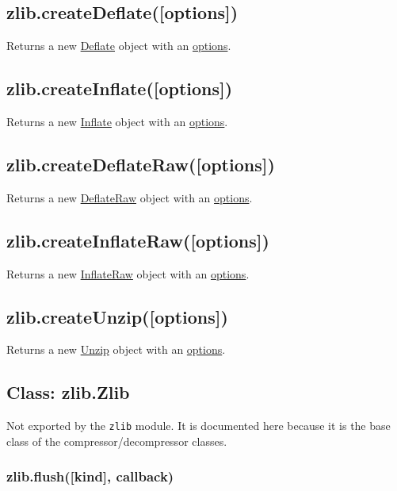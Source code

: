 \subsection{zlib.createDeflate({[}options{]})}

Returns a new \hyperref[zlib\_class\_zlib\_deflate]{Deflate} object with
an \hyperref[zlib\_options]{options}.

\subsection{zlib.createInflate({[}options{]})}

Returns a new \hyperref[zlib\_class\_zlib\_inflate]{Inflate} object with
an \hyperref[zlib\_options]{options}.

\subsection{zlib.createDeflateRaw({[}options{]})}

Returns a new \hyperref[zlib\_class\_zlib\_deflateraw]{DeflateRaw}
object with an \hyperref[zlib\_options]{options}.

\subsection{zlib.createInflateRaw({[}options{]})}

Returns a new \hyperref[zlib\_class\_zlib\_inflateraw]{InflateRaw}
object with an \hyperref[zlib\_options]{options}.

\subsection{zlib.createUnzip({[}options{]})}

Returns a new \hyperref[zlib\_class\_zlib\_unzip]{Unzip} object with an
\hyperref[zlib\_options]{options}.

\subsection{Class: zlib.Zlib}

Not exported by the \texttt{zlib} module. It is documented here because
it is the base class of the compressor/decompressor classes.

\subsubsection{zlib.flush({[}kind{]}, callback)}

